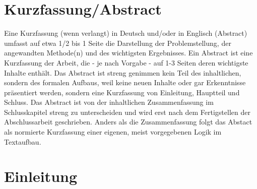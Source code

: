 \documentclass[a4paper,11pt]{article}%
\renewcommand{\\}{\vspace*{0.5\baselineskip} \newline}
\begin{document}
\section*{Kurzfassung/Abstract}
Eine Kurzfassung (wenn verlangt) in Deutsch und/oder in Englisch (Abstract) umfasst auf etwa 1/2 bis 1 Seite die Darstellung der Problemstellung, der angewandten Methode(n) und des wichtigsten Ergebnisses.\\
Ein Abstract ist eine Kurzfassung der Arbeit, die - je nach Vorgabe - auf 1-3 Seiten deren wichtigste Inhalte enthält. 
Das Abstract ist streng genimmen kein Teil des inhaltlichen, sondern des formalen Aufbaus, weil keine neuen Inhalte oder gar Erkenntnisse präsentiert werden, 
sondern eine Kurzfassung von Einleitung, Hauptteil und Schluss. Das Abstract ist von der inhaltlichen Zusammenfassung im Schlusskapitel streng zu unterscheiden und wird erst nach dem Fertigstellen der Abschlussarbeit geschrieben. 
Anders als die Zusammenfassung folgt das Abstact als normierte Kurzfassung einer eigenen, meist vorgegebenen Logik im Textaufbau.
\newpage

\tableofcontents
\newpage

\listoftables{}
\newpage

\listoffigures{}
\newpage

\section*{Einleitung}
\end{document}
